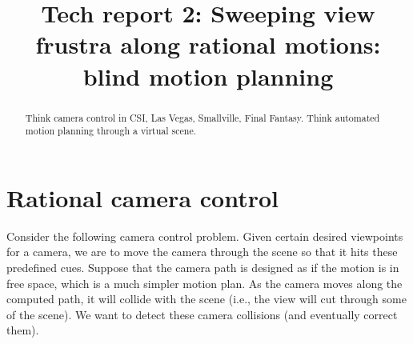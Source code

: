 \documentclass[12pt]{article}
\title{Tech report 2: Sweeping view frustra along rational motions: blind motion planning}
\begin{document}
\maketitle

\begin{abstract}
Think camera control in CSI, Las Vegas, Smallville, Final Fantasy.
Think automated motion planning through a virtual scene.
\end{abstract}

\section{Rational camera control}

Consider the following camera control problem.
Given certain desired viewpoints for a camera, we are to move the camera through the scene
so that it hits these predefined cues.
Suppose that the camera path is designed as if the motion is in free space,
which is a much simpler motion plan.
As the camera moves along the computed path, it will collide with the scene (i.e., the
view will cut through some of the scene).
We want to detect these camera collisions (and eventually correct them).

\end{document}
